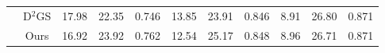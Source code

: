 \documentclass[letterpaper]{article} %
\begin{document}
\begin{table}[ht!]
{\begin{tabular}{c c | ccc | ccc | ccc}
   
  & D$^2$GS    
      &\cellcolor{blue!8}17.98 &\cellcolor{blue!8}22.35 &\cellcolor{blue!8}0.746 
      &13.85 &\cellcolor{blue!8}23.91 &\cellcolor{blue!8}0.846 
      &8.91 &\cellcolor{color_blue}26.80 &\cellcolor{blue!8}0.871 \\  
        
  & Ours  
      &\cellcolor{color_blue}16.92 &\cellcolor{color_blue}23.92 &\cellcolor{color_blue}0.762 
      &\cellcolor{blue!8}12.54 &\cellcolor{color_blue}25.17 &\cellcolor{color_blue}0.848
      &\cellcolor{blue!8}8.96 &\cellcolor{blue!8}26.71 &\cellcolor{blue!8}0.871 \\  

\toprule     
       \end{tabular}
   }

\end{table}
\end{document}
